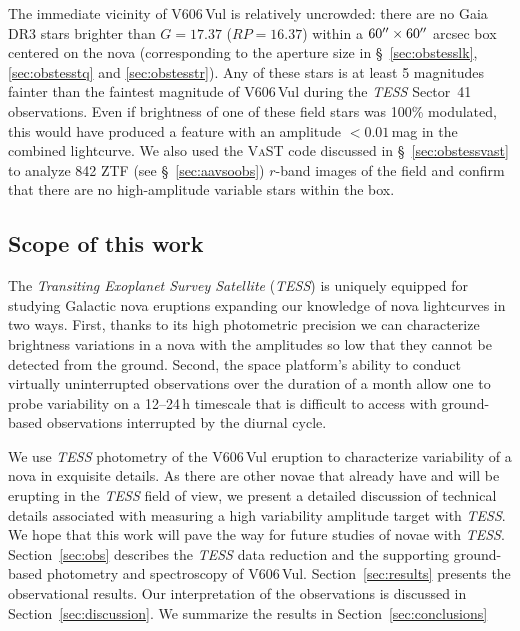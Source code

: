 \documentclass[twocolumn]{aastex631}
\newcommand{\nova}{V606\,Vul}
\begin{document}
The immediate vicinity of \nova{} is relatively uncrowded:
there are no Gaia\,DR3 stars brighter than $G=17.37$ ($RP=16.37$) within 
a $60\mbox{$^{\prime\prime}$} \times 60\mbox{$^{\prime\prime}$}$ arcsec box centered on the nova
(corresponding to the aperture size in \S~\ref{sec:obstesslk}, \ref{sec:obstesstq} and \ref{sec:obstesstr}).
Any of these stars is at least 5 magnitudes fainter than the faintest magnitude of
\nova{} during the {\em TESS} Sector~41 observations. 
Even if brightness of one of these field stars was 100\% modulated, 
this would have produced a feature with an amplitude $<0.01$\,mag in 
the combined lightcurve. We also used the \textsc{VaST} code discussed 
in \S~\ref{sec:obstessvast} to analyze 842 ZTF (see \S~\ref{sec:aavsoobs}) $r$-band images of the field
and confirm that there are no high-amplitude variable stars within the box.

%
\subsection{Scope of this work}
\label{sec:thispaper}

The {\em Transiting Exoplanet Survey Satellite} ({\em TESS}) is uniquely equipped for studying Galactic nova eruptions 
expanding our knowledge of nova lightcurves in two ways. First, thanks to its high photometric precision 
we can characterize brightness variations in a nova with the amplitudes so low that they cannot be detected from the ground. 
Second, the space platform's ability to conduct virtually uninterrupted observations over the duration of a month allow 
one to probe variability on a 12--24\,h timescale that is difficult to access with ground-based observations interrupted by the diurnal cycle.

We use {\em TESS} photometry of the \nova{} eruption to characterize
variability of a nova in exquisite details.
As there are other novae that already have and will be erupting in the {\em TESS} field of view, 
we present a detailed discussion of technical details associated with measuring a high variability amplitude target with {\em TESS}. 
We hope that this work will pave the way for future studies of novae with {\em TESS}.
Section~\ref{sec:obs} describes the {\em TESS} data
reduction and the supporting ground-based photometry and spectroscopy of \nova{}.
Section~\ref{sec:results} presents the observational results.
Our interpretation of the observations is discussed in Section~\ref{sec:discussion}. 
We summarize the results in Section~\ref{sec:conclusions}
\end{document}
